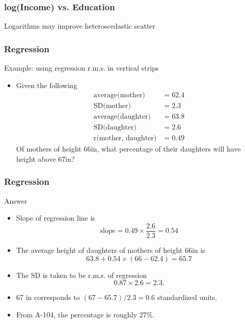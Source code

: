 \documentclass[handout]{beamer}
\begin{document}
   \begin{frame}
   \frametitle{log(Income) vs. Education}
   \begin{center}
   \end{center}
   Logarithms may improve heteroscedastic scatter
   \end{frame}


   \begin{frame} \frametitle{Regression}

   \begin{block}
   {Example: using regression r.m.s. in vertical strips}
   \begin{itemize}
   \item Given the following
     $$
     \begin{aligned}
       \text{average(mother)} &= 62.4\\
       \text{SD(mother)} &= 2.3 \\
       \text{average(daughter)} &= 63.8 \\
       \text{SD(daughter)} &= 2.6 \\
       \text{r(mother, daughter)} &= 0.49
     \end{aligned}
     $$
   Of mothers of height 66in, what percentage
   of their daughters will have height above 67in?

   \end{itemize}
   \end{block}
   \end{frame}


   \begin{frame} \frametitle{Regression}

   \begin{block}
   {Answer}
   \begin{itemize}
   \item Slope of regression line is
   $$
   \text{slope} = 0.49 \times \frac{2.6}{2.3} = 0.54
   $$
   \item The average height of daughters of
   mothers of height 66in is
   $$
   63.8 + 0.54 \times (66 - 62.4) = 65.7
   $$

   \item The SD is taken to be r.m.s. of regression
   $$
   0.87 \times 2.6 = 2.3.
   $$


     \item 67 in corresponds to $(67-65.7)/2.3=0.6$ standardized units.

     \item From A-104, the percentage is roughly 27\%.

   \end{itemize}
   \end{block}
   \end{frame}
\end{document}
